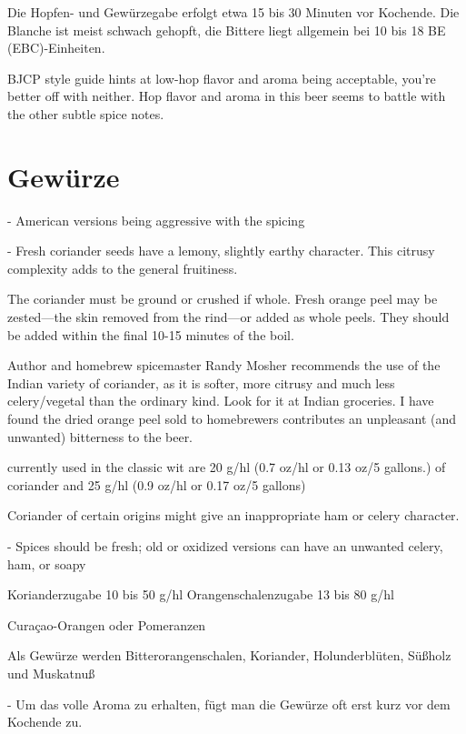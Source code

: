 \documentclass[a4paper,parskip=half]{scrartcl}
\begin{document}
\parencite[17]{Strottner1999}
Die Hopfen- und Gewürzegabe erfolgt etwa 15 bis 30 Minuten vor Kochende. Die
Blanche ist meist schwach gehopft, die Bittere liegt allgemein bei 10 bis 18 BE
(EBC)-Einheiten.

\parencite{Zainasheff2007}
BJCP style guide hints at low-hop flavor and aroma being acceptable, you’re better
off with neither. Hop flavor and aroma in this beer seems to battle with the other subtle spice notes.

\section*{Gewürze}

\parencite[26]{Strong2021}
- American versions being aggressive with the spicing

- Fresh coriander seeds have a lemony, slightly
earthy character. This citrusy complexity adds to the general
fruitiness.


\parencite[29]{Sparrow2002}
The coriander
must be ground or crushed if whole. Fresh
orange peel may be zested—the skin
removed from the rind—or added as whole
peels. They should be added within the final
10-15 minutes of the boil.

Author and homebrew spicemaster
Randy Mosher recommends the use of the
Indian variety of coriander, as it is softer,
more citrusy and much less celery/vegetal
than the ordinary kind. Look for it at Indian
groceries. I have found the dried orange peel
sold to homebrewers contributes an
unpleasant (and unwanted) bitterness to the
beer.

\parencite[29]{Sparrow2002}
currently used in the classic wit are 20 g/hl
(0.7 oz/hl or 0.13 oz/5 gallons.) of coriander
and 25 g/hl (0.9 oz/hl or 0.17 oz/5 gallons)

\parencite[48]{BJCP2015}
Coriander of certain origins
might give an inappropriate ham or celery character. 

\parencite[26]{Strong2021}
- Spices should be fresh; old or oxidized versions can have an unwanted celery, ham, or soapy

\parencite[13]{Strottner1999}
Korianderzugabe 10 bis 50 g/hl
Orangenschalenzugabe 13 bis 80 g/hl

Curaçao-Orangen oder Pomeranzen


\parencite[1]{Strottner1999}
Als Gewürze werden
Bitterorangenschalen,
Koriander,
Holunderblüten,
Süßholz
und
Muskatnuß

\parencite[2]{Strottner1999}
- Um das volle Aroma zu erhalten, fügt man die Gewürze oft erst kurz vor dem
Kochende zu.
\end{document}
